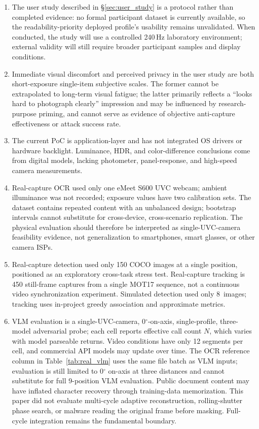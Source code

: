 \documentclass{ieeeaccess}
\begin{document}
\begin{enumerate}
\item The user study described in \S\ref{sec:user_study} is a protocol rather than completed evidence: no formal participant dataset is currently available, so the readability-priority deployed profile's usability remains unvalidated. When conducted, the study will use a controlled 240\,Hz laboratory environment; external validity will still require broader participant samples and display conditions.
\item Immediate visual discomfort and perceived privacy in the user study are both short-exposure single-item subjective scales. The former cannot be extrapolated to long-term visual fatigue; the latter primarily reflects a ``looks hard to photograph clearly'' impression and may be influenced by research-purpose priming, and cannot serve as evidence of objective anti-capture effectiveness or attack success rate.
\item The current PoC is application-layer and has not integrated OS drivers or hardware backlight. Luminance, HDR, and color-difference conclusions come from digital models, lacking photometer, panel-response, and high-speed camera measurements.
\item Real-capture OCR used only one eMeet S600 UVC webcam; ambient illuminance was not recorded; exposure values have two calibration sets. The dataset contains repeated content with an unbalanced design; bootstrap intervals cannot substitute for cross-device, cross-scenario replication. The physical evaluation should therefore be interpreted as single-UVC-camera feasibility evidence, not generalization to smartphones, smart glasses, or other camera ISPs.
\item Real-capture detection used only 150 COCO images at a single position, positioned as an exploratory cross-task stress test. Real-capture tracking is 450 still-frame captures from a single MOT17 sequence, not a continuous video synchronization experiment. Simulated detection used only 8~images; tracking uses in-project greedy association and approximate metrics.
\item VLM evaluation is a single-UVC-camera, 0$^{\circ}$-on-axis, single-profile, three-model adversarial probe; each cell reports effective call count $N$, which varies with model parseable returns. Video conditions have only 12 segments per cell, and commercial API models may update over time. The OCR reference column in Table~\ref{tab:real_vlm} uses the same file batch as VLM inputs; evaluation is still limited to 0$^{\circ}$ on-axis at three distances and cannot substitute for full 9-position VLM evaluation. Public document content may have inflated character recovery through training-data memorization. This paper did not evaluate multi-cycle adaptive reconstruction, rolling-shutter phase search, or malware reading the original frame before masking. Full-cycle integration remains the fundamental boundary.
\end{enumerate}
\end{document}
